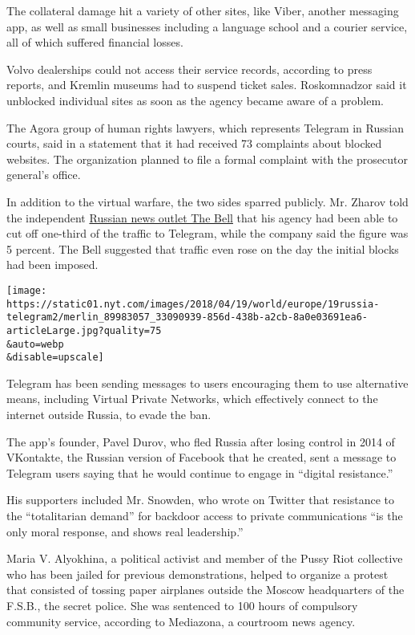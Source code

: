 The collateral damage hit a variety of other sites, like Viber, another
messaging app, as well as small businesses including a language school
and a courier service, all of which suffered financial losses.

Volvo dealerships could not access their service records, according to
press reports, and Kremlin museums had to suspend ticket sales.
Roskomnadzor said it unblocked individual sites as soon as the agency
became aware of a problem.

The Agora group of human rights lawyers, which represents Telegram in
Russian courts, said in a statement that it had received 73 complaints
about blocked websites. The organization planned to file a formal
complaint with the prosecutor general's office.

In addition to the virtual warfare, the two sides sparred publicly. Mr.
Zharov told the independent
\href{https://thebell.io/glava-roskomnadzora-telegram-zablokirovan-na-30/}{Russian
news outlet The Bell} that his agency had been able to cut off one-third
of the traffic to Telegram, while the company said the figure was 5
percent. The Bell suggested that traffic even rose on the day the
initial blocks had been imposed.

\texttt{[image: https://static01.nyt.com/images/2018/04/19/world/europe/19russia-telegram2/merlin\_89983057\_33090939-856d-438b-a2cb-8a0e03691ea6-articleLarge.jpg?quality=75\\\&auto=webp\\\&disable=upscale]}

Telegram has been sending messages to users encouraging them to use
alternative means, including Virtual Private Networks, which effectively
connect to the internet outside Russia, to evade the ban.

The app's founder, Pavel Durov, who fled Russia after losing control in
2014 of VKontakte, the Russian version of Facebook that he created, sent
a message to Telegram users saying that he would continue to engage in
``digital resistance.''

His supporters included Mr. Snowden, who wrote on Twitter that
resistance to the ``totalitarian demand'' for backdoor access to private
communications ``is the only moral response, and shows real
leadership.''

Maria V. Alyokhina, a political activist and member of the Pussy Riot
collective who has been jailed for previous demonstrations, helped to
organize a protest that consisted of tossing paper airplanes outside the
Moscow headquarters of the F.S.B., the secret police. She was sentenced
to 100 hours of compulsory community service, according to Mediazona, a
courtroom news agency.

